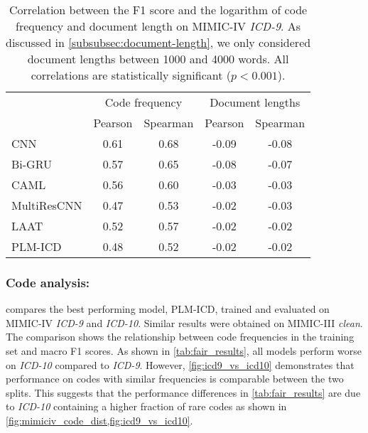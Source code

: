 {\begin{table}[t]
    \centering
    \caption[Correlation between the F1 score and the logarithm of code frequency and document length on MIMIC-IV \textit{ICD-9}.]{Correlation between the F1 score and the logarithm of code frequency and document length on MIMIC-IV \textit{ICD-9}. As discussed in \cref{subsubsec:document-length}, we only considered document lengths between 1000 and 4000 words. All correlations are statistically significant ($p<0.001$).}
    \label{tab:correlations}
    \begin{tabular}{lcccc}
        \toprule
        & \multicolumn{2}{c}{Code frequency} & \multicolumn{2}{c}{Document lengths}\\
        \cmidrule(lr){2-3}\cmidrule(lr){4-5}
        & Pearson & Spearman & Pearson & Spearman \\
        \midrule
        CNN  & 0.61 & 0.68 & -0.09 & -0.08 \\
        Bi-GRU & 0.57 & 0.65 & -0.08 & -0.07 \\
        CAML & 0.56 & 0.60 & -0.03 & -0.03   \\
        MultiResCNN & 0.47 & 0.53 & -0.02 & -0.03  \\
        LAAT & 0.52 & 0.57 & -0.02 & -0.02 \\
        PLM-ICD & 0.48 & 0.52 & -0.02 & -0.02   \\
        \bottomrule
    \end{tabular}
\end{table}


\subsubsection{Code analysis:}

 compares the best performing model, PLM-ICD, trained and evaluated on MIMIC-IV \textit{ICD-9} and \textit{ICD-10}. Similar results were obtained on MIMIC-III \textit{clean}.
The comparison shows the relationship between code frequencies in the training set and macro F1 scores. As shown in \cref{tab:fair_results}, all models perform worse on \textit{ICD-10} compared to \textit{ICD-9}. However, \cref{fig:icd9_vs_icd10} demonstrates that performance on codes with similar frequencies is comparable between the two splits. This suggests that the performance differences in \cref{tab:fair_results} are due to \textit{ICD-10} containing a higher fraction of rare codes as shown in \cref{fig:mimiciv_code_dist,fig:icd9_vs_icd10}.

}
